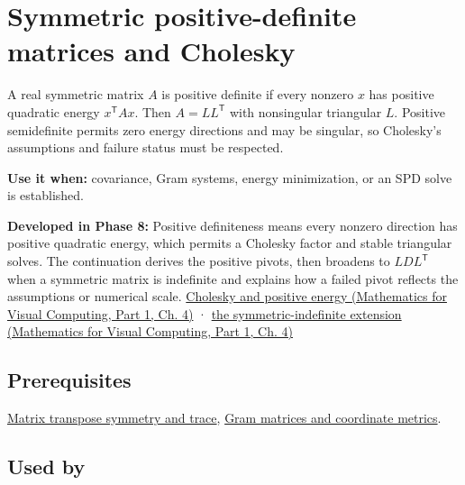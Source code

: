 \hypertarget{appendix-50d2ea3c9b26}{}\label{referencestart:appendix-50d2ea3c9b26}
\section{Symmetric positive-definite matrices and Cholesky}\label{appendix-50d2ea3c9b26-symmetric-positive-definite-matrices-and-cholesky}

\hypertarget{appendix-50d2ea3c9b26-symmetric-positive-definite-matrices-and-cholesky}{}

A real symmetric matrix \(A\) is positive definite if every nonzero \(x\) has positive quadratic energy \(x^\mathsf T A x\). Then \(A=LL^\mathsf T\) with nonsingular triangular \(L\). Positive semidefinite permits zero energy directions and may be singular, so Cholesky's assumptions and failure status must be respected.

\textbf{Use it when:} covariance, Gram systems, energy minimization, or an SPD solve is established.

\textbf{Developed in Phase 8:} Positive definiteness means every nonzero direction has positive quadratic energy, which permits a Cholesky factor and stable triangular solves. The continuation derives the positive pivots, then broadens to \(LDL^\mathsf T\) when a symmetric matrix is indefinite and explains how a failed pivot reflects the assumptions or numerical scale. \href{../02-Mathematics-for-Visual-Computing-P01/main.pdf\#nameddest=01-foundations-i-ch020-positive-definiteness-is-a-structural-promise}{Cholesky and positive energy (Mathematics for Visual Computing, Part 1, Ch. 4)} · \href{../02-Mathematics-for-Visual-Computing-P01/main.pdf\#nameddest=01-foundations-i-ch020-ldlt-reaches-symmetric-indefinite-matrices}{the symmetric-indefinite extension (Mathematics for Visual Computing, Part 1, Ch. 4)}

\subsection{Prerequisites}\label{appendix-50d2ea3c9b26-prerequisites}

\hypertarget{appendix-50d2ea3c9b26-prerequisites}{}

\hyperref[appendix-175ca5ff874d]{Matrix transpose symmetry and trace}, \hyperref[appendix-3b863809f82a]{Gram matrices and coordinate metrics}.

\subsection{Used by}\label{appendix-50d2ea3c9b26-used-by}

